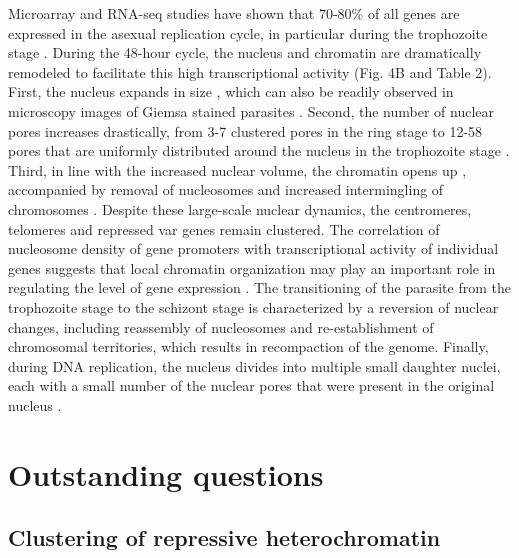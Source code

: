 Microarray and RNA-seq studies have shown that 70-80\% of all genes are
expressed in the asexual replication cycle, in particular during the
trophozoite stage \citep{bunnik:polysome, leroch:discovery, otto:new}.
During the 48-hour cycle, the nucleus and
chromatin are dramatically remodeled to facilitate this high transcriptional
activity (Fig. 4B and Table 2). First, the nucleus expands in size
\citep{weiner:3d}, which
can also be readily observed in microscopy images of Giemsa stained parasites
\citep{ay:three-dimensional}. Second, the number of nuclear pores increases 
drastically, from 3-7
clustered pores in the ring stage to 12-58 pores that are uniformly
distributed around the nucleus in the trophozoite stage \citep{weiner:3d}.
Third, in line
with the increased nuclear volume, the chromatin opens up
\citep{ay:three-dimensional, weiner:3d}, accompanied
by removal of nucleosomes \citep{bunnik:DNA-encoded, ponts:nucleosome}
 and increased intermingling of chromosomes
\citep{ay:three-dimensional}. Despite these large-scale nuclear dynamics, the centromeres, telomeres
and repressed var genes remain clustered. The correlation of nucleosome
density of gene promoters with transcriptional activity of individual genes
suggests that local chromatin organization may play an important role in
regulating the level of gene expression \citep{bunnik:DNA-encoded}. The transitioning of the
parasite from the trophozoite stage to the schizont stage is characterized by
a reversion of nuclear changes, including reassembly of nucleosomes and
re-establishment of chromosomal territories, which results in recompaction of
the genome. Finally, during DNA replication, the nucleus divides into multiple
small daughter nuclei, each with a small number of the nuclear pores that were
present in the original nucleus \citep{weiner:3d}.

\section{Outstanding questions}

\subsection{Clustering of repressive heterochromatin}

